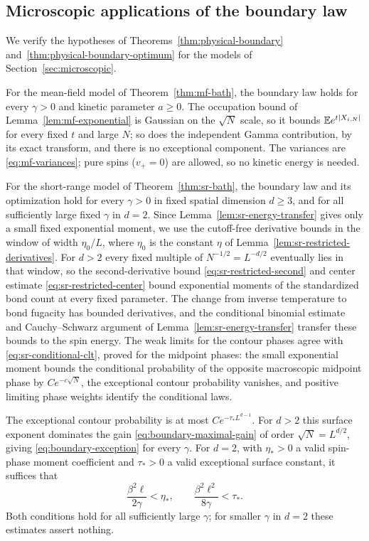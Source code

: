 \subsection{Microscopic applications of the boundary law}
\label{subsec:boundary-applications}

We verify the hypotheses of Theorems~\ref{thm:physical-boundary}
and~\ref{thm:physical-boundary-optimum} for the models of
Section~\ref{sec:microscopic}.

For the mean-field model of Theorem~\ref{thm:mf-bath}, the boundary law
holds for every $\gamma>0$ and kinetic parameter $a\ge0$. The
occupation bound of Lemma~\ref{lem:mf-exponential} is Gaussian on the
$\sqrt N$ scale, so it bounds $\mathbb E e^{t|X_{i,N}|}$ for every fixed $t$
and large $N$; so does the independent Gamma contribution, by its
exact transform, and there is no exceptional component. The variances
are \eqref{eq:mf-variances}; pure spins ($v_+=0$) are allowed, so no
kinetic energy is needed.

For the short-range model of Theorem~\ref{thm:sr-bath}, the boundary
law and its optimization hold for every $\gamma>0$ in fixed spatial
dimension $d\ge3$, and for all sufficiently large fixed $\gamma$ in
$d=2$. Since Lemma~\ref{lem:sr-energy-transfer} gives only a small
fixed exponential moment, we use the cutoff-free derivative bounds in
the window of width $\eta_0/L$, where $\eta_0$ is the constant $\eta$
of Lemma~\ref{lem:sr-restricted-derivatives}. For $d>2$ every fixed
multiple of $N^{-1/2}=L^{-d/2}$ eventually lies in that window, so the
second-derivative bound \eqref{eq:sr-restricted-second} and center
estimate \eqref{eq:sr-restricted-center} bound exponential moments of
the standardized bond count at every fixed parameter. The change from
inverse temperature to bond fugacity has bounded derivatives, and the
conditional binomial estimate and Cauchy--Schwarz argument of
Lemma~\ref{lem:sr-energy-transfer} transfer these bounds to the spin
energy. The weak limits for the contour phases agree with
\eqref{eq:sr-conditional-clt}, proved for the midpoint phases: the
small exponential moment bounds the conditional probability of the
opposite macroscopic midpoint phase by $Ce^{-c\sqrt N}$, the
exceptional contour probability vanishes, and positive limiting phase
weights identify the conditional laws.

The exceptional contour probability is at most $Ce^{-\tau_* L^{d-1}}$.
For $d>2$ this surface exponent dominates the gain
\eqref{eq:boundary-maximal-gain} of order $\sqrt N=L^{d/2}$, giving
\eqref{eq:boundary-exception} for every $\gamma$. For $d=2$, with
$\eta_*>0$ a valid spin-phase moment coefficient and $\tau_*>0$ a valid
exceptional surface constant, it suffices that
\begin{equation}
 \frac{\beta^2\ell}{2\gamma}<\eta_*,
 \qquad \frac{\beta^2\ell^2}{8\gamma}<\tau_*.
 \label{eq:two-dimensional-boundary-range}
\end{equation}
Both conditions hold for all sufficiently large $\gamma$; for smaller
$\gamma$ in $d=2$ these estimates assert nothing.


